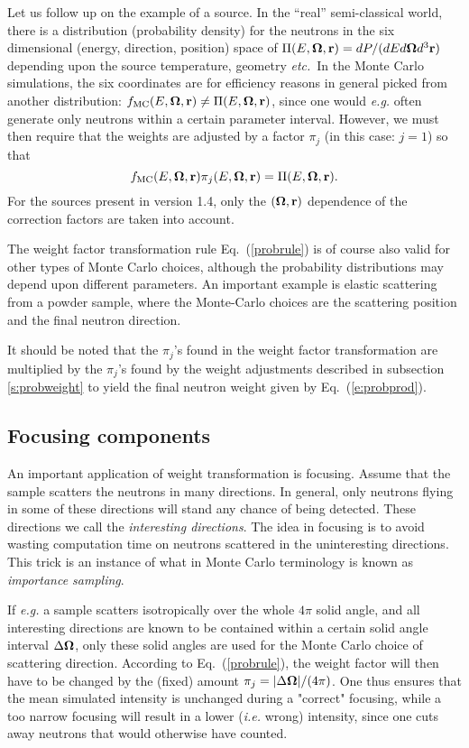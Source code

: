 Let us follow up on the example of a source.
In the ``real'' semi-classical world, there is a distribution
(probability density) for the neutrons in the six dimensional
(energy, direction, position) space of
$\Pi(E,\mbox{\boldmath $\Omega$},{\bf r}) = dP/(dE d\mbox{\boldmath $\Omega$} d^3{\bf r})$ depending upon
the source temperature, geometry {\em etc.}\ In the
Monte Carlo simulations, the six coordinates are for efficiency reasons
in general picked from another distribution:
$f_{\rm MC}(E,\mbox{\boldmath $\Omega$},{\bf r}) \neq \Pi(E, \mbox{\boldmath $\Omega$},{\bf r})$,
since one would {\em e.g.} often generate
only neutrons within a certain parameter interval.
However, we must then require that the weights are adjusted
by a factor $\pi_j$ (in this case: $j=1$) so that
\begin{equation} \label{probrule}
f_{\rm MC}(E,\mbox{\boldmath $\Omega$},{\bf r}) \pi_j(E,\mbox{\boldmath $\Omega$},{\bf r})
 = \Pi(E,\mbox{\boldmath $\Omega$},{\bf r}) .
\end{equation}
For the sources present in version 1.4, 
only the $(\mbox{\boldmath $\Omega$}, {\bf r})$ dependence of the correction factors
are taken into account.

The weight factor transformation rule Eq.~(\ref{probrule})
is of course also valid for other types of Monte Carlo choices,
although the probability distributions may depend upon 
different parameters. An important example 
is elastic scattering from a powder sample,
where the Monte-Carlo choices are the scattering position
and the final neutron direction.

It should be noted that the $\pi_j$'s found in the weight factor 
transformation are multiplied by the $\pi_j$'s found by the
weight adjustments described in
subsection \ref{s:probweight} to yield the final neutron
weight given by Eq.~(\ref{e:probprod}).

\subsection{Focusing components}
\label{s:focus}
An important application of weight transformation is focusing.
Assume that the sample scatters the neutrons in many directions.
In general, only neutrons flying in some of these directions will
stand any chance of being detected. These directions we call
the {\em interesting directions}.
The idea in focusing is to avoid wasting computation time on
neutrons scattered in the uninteresting directions. 
This trick is an instance of what in Monte Carlo terminology
is known as {\em importance sampling}. %

If {\em e.g.} a sample scatters isotropically 
over the whole $4\pi$ solid angle, and all interesting
directions are known to be contained within a certain 
solid angle interval $\Delta \mbox{\boldmath $\Omega$}$, only these solid angles 
are used for the Monte Carlo choice of scattering direction. 
According to Eq.~(\ref{probrule}), the weight factor will then have
to be changed by the (fixed) amount 
$\pi_j = |\Delta \mbox{\boldmath $\Omega$}| / (4 \pi)$.
One thus ensures that the mean simulated intensity is unchanged
during a "correct" focusing, while a too narrow focusing will
result in a lower (\textit{i.e.} wrong) intensity, since one cuts
away neutrons that would otherwise have counted.

